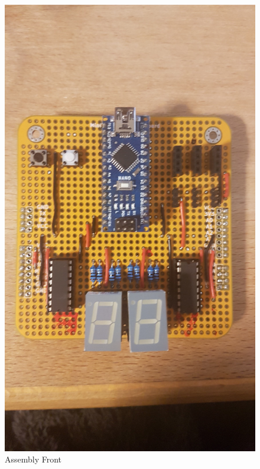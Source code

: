 \begin{figure}[h]
\begin{minipage}{.5\textwidth}
	\includegraphics[width =1\textwidth]{"assets/assembly_front"}
	\centering
	\caption{Assembly Front}
	\label{fig:Assembly_Front}
\end{minipage}
\end{figure}

